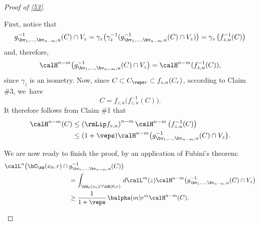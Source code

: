 \begin{proof}[Proof of \ref{53}]
\begin{Empty*}
First, notice that
\begin{equation*}
g_{\bv_1,\ldots,\bv_{n-m},u}^{-1}(C) \cap V_z = \gamma_z \bigl(\gamma_z^{-1}(g_{\bv_1,\ldots,\bv_{n-m},u}^{-1}(C) \cap V_z) \bigr) = \gamma_z \left(f_{z,u}^{-1}(C)\right)
\end{equation*}
and, therefore,
\begin{equation*}
\calH^{n-m}\bigl(g_{\bv_1,\ldots,\bv_{n-m},u}^{-1}(C) \cap V_z\bigr) = \calH^{n-m}(f_{z,u}^{-1}(C)),
\end{equation*}
since $\gamma_z$ is an isometry.
Now, since $C \subset C_{\veps r} \subset f_{z,u}(C_r)$, according to Claim \#3, we~have
\begin{equation*}
C = f_{z,u} \bigl(f_{z,u}^{-1}(C) \bigr).
\end{equation*}
It therefore follows from Claim \#1 that
\begin{equation*}
\begin{split}
\calH^{n-m}(C) & \leq \left(\rmLip f_{z,u} \right)^{n-m} \calH^{n-m} \left(f_{z,u}^{-1}(C)\right) \\
& \leq (1+\veps) \calH^{n-m} \bigl(g_{\bv_1,\ldots,\bv_{n-m},u}^{-1}(C) \cap V_z \bigr).
\end{split}
\end{equation*}
\par
We are now ready to finish the proof, by an application of Fubini's theorem:
\begin{align*}
\calL^n \bigl(\bC_\bW(x_0,r) \cap{} & g_{\bv_1,\ldots,\bv_{n-m},u}^{-1}(C)\bigr)\\& = \int_{\bW_0(x_0) \cap \bB(0,r)} \,d\calL^m(z) \calH^{n-m}\bigl(g_{\bv_1,\ldots,\bv_{n-m},u}^{-1}(C) \cap V_z \bigr) \\
& \geq \frac{1}{1+\veps}\, \balpha(m)r^m \calH^{n-m}(C).\qedhere
\end{align*}
\end{Empty*}
\end{proof}

